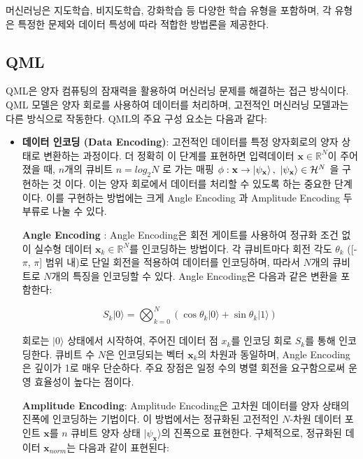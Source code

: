 머신러닝은 지도학습, 비지도학습, 강화학습 등 다양한 학습 유형을 포함하며, 각 유형은 특정한 문제와 데이터 특성에 따라 적합한 방법론을 제공한다.


\subsection{QML}
QML은 양자 컴퓨팅의 잠재력을 활용하여 머신러닝 문제를 해결하는 접근 방식이다. QML 모델은 양자 회로를 사용하여 데이터를 처리하며, 고전적인 머신러닝 모델과는 다른 방식으로 작동한다. QML의 주요 구성 요소는 다음과 같다:

\begin{itemize}
    \item \textbf{데이터 인코딩 (Data Encoding)}: 고전적인 데이터를 특정 양자회로의 양자 상태로 변환하는 과정이다. 더 정확히 이 단계를 표현하면 입력데이터 $\mathbf{x} \in \mathbb{R}^N $이 주어졌을 때, $n$개의 큐비트  $ n  = log_2N$  로 가는 매핑  ${\phi : \mathbf{x}  \rightarrow \ket{ \psi_\mathbf{x}} , \ \ket { \psi_\mathbf{x}} \in \mathcal{H}^{N} }$  을 구현하는 것 이다. 이는 양자 회로에서 데이터를 처리할 수 있도록 하는 중요한 단계이다. 이를 구현하는 방법에는 크게 Angle Encoding 과 Amplitude Encoding 두 부류로 나눌 수 있다.

    \subitem \textbf{Angle Encoding} :
        Angle Encoding은 회전 게이트를 사용하여 정규화 조건 없이 실수형 데이터 \( \mathbf{x}_k \in \mathbb{R}^N \)를 인코딩하는 방법이다. 각 큐비트마다 회전 각도 \( \theta_k \) ([-\(\pi\), \(\pi\)] 범위 내)로 단일 회전을 적용하여 데이터를 인코딩하며, 따라서 \( N \)개의 큐비트로 \( N \)개의 특징을 인코딩할 수 있다. Angle Encoding은 다음과 같은 변환을 포함한다:

        \[
        S_k |0\rangle = \bigotimes_{k=0}^{N} \left( \cos{\theta_k} |0\rangle + \sin{\theta_k} |1\rangle \right)
        \]

        회로는 \( |0\rangle \) 상태에서 시작하여, 주어진 데이터 점 \( x_k \)를 인코딩 회로 \( S_k \)를 통해 인코딩한다. 큐비트 수 \( N \)은 인코딩되는 벡터 \( \mathbf{x}_k \)의 차원과 동일하며, Angle Encoding은 깊이가 1로 매우 단순하다. 주요 장점은 일정 수의 병렬 회전을 요구함으로써 운영 효율성이 높다는 점이다.

    \subitem \textbf{Amplitude Encoding}:
    Amplitude Encoding은 고차원 데이터를 양자 상태의 진폭에 인코딩하는 기법이다. 이 방법에서는 정규화된 고전적인 \( N \)-차원 데이터 포인트 \( \mathbf{x} \)를 \( n \) 큐비트 양자 상태 \( |\psi_{\mathbf{x}}\rangle \)의 진폭으로 표현한다. 구체적으로, 정규화된 데이터 \( \mathbf{x}_{norm} \)는 다음과 같이 표현된다:


\end{itemize}
